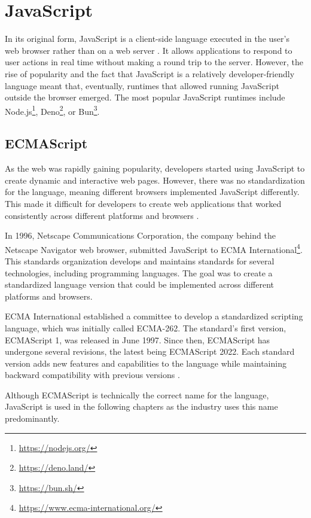 \section{JavaScript}

In its original form, JavaScript is a client-side language executed in the user's web browser rather than on a web server \cite{JSDefinitiveGuide}. It allows applications to respond to user actions in real time without making a round trip to the server. However, the rise of popularity and the fact that JavaScript is a relatively developer-friendly language meant that, eventually, runtimes that allowed running JavaScript outside the browser emerged. The most popular JavaScript runtimes include Node.js\footnote{\url{https://nodejs.org/}}, Deno\footnote{\url{https://deno.land/}}, or Bun\footnote{\url{https://bun.sh/}}.

\subsection{ECMAScript}

As the web was rapidly gaining popularity, developers started using JavaScript to create dynamic and interactive web pages. However, there was no standardization for the language, meaning different browsers implemented JavaScript differently. This made it difficult for developers to create web applications that worked consistently across different platforms and browsers \cite{JSDefinitiveGuide}.

In 1996, Netscape Communications Corporation, the company behind the Netscape Navigator web browser, submitted JavaScript to ECMA International\footnote{\url{https://www.ecma-international.org/}}. This standards organization develops and maintains standards for several technologies, including programming languages. The goal was to create a standardized language version that could be implemented across different platforms and browsers.

ECMA International established a committee to develop a standardized scripting language, which was initially called ECMA-262. The standard's first version, ECMAScript 1, was released in June 1997. Since then, ECMAScript has undergone several revisions, the latest being ECMAScript 2022. Each standard version adds new features and capabilities to the language while maintaining backward compatibility with previous versions \cite{JSDefinitiveGuide}.

Although ECMAScript is technically the correct name for the language, JavaScript is used in the following chapters as the industry uses this name predominantly.

